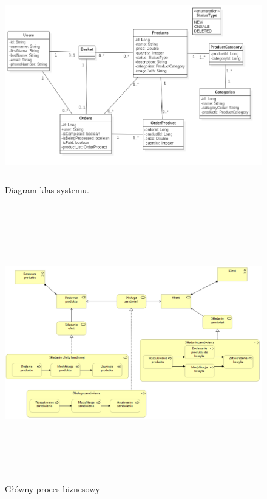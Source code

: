 \documentclass[11pt,a4paper,twoside]{article}
\begin{document}
\begin{figure}[ht]
\caption{Diagram klas systemu.}
\label{diagramKlas}
\centering
\includegraphics[height=8.4cm, width=15.7cm]{Klasy}
\end{figure}


\begin{figure}[ht]
\caption{Główny proces biznesowy}
\label{procesBiznesowy01}
\centering
\includegraphics[height=12cm, width=15.7cm]{01_biznes}
\end{figure}
\end{document}
